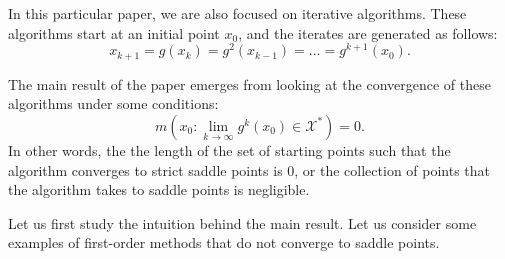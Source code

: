 \documentclass[twoside]{article}
\theoremstyle{definition}
\theoremstyle{definition}
\theoremstyle{remark}
\begin{document}
In this particular paper, we are also focused on iterative algorithms. These algorithms start at an initial point $x_0$, and the iterates are generated as follows:
$$x_{k+1} = g(x_k) = g^2(x_{k-1}) = \ldots = g^{k+1}(x_0).$$

The main result of the paper emerges from looking at the convergence of these algorithms under some conditions:
$$m(x_0 : \lim_{k\to\infty} g^k(x_0) \in \mathcal{X}^*) = 0.$$
In other words, the the length of the set of starting points such that the algorithm converges to strict saddle points is 0, or the collection of points that the algorithm takes to saddle points is negligible.

Let us first study the intuition behind the main result. Let us consider some examples of first-order methods that do not converge to saddle points. 
\end{document}
